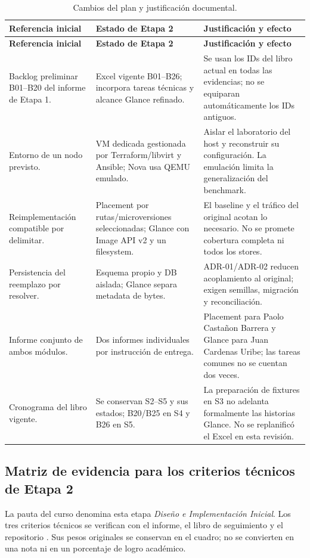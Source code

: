 \documentclass[12pt,a4paper]{article}
\newcommand{\reporttable}[4]{\begingroup\small\setlength{\LTpre}{8pt}\setlength{\LTpost}{8pt}\setlength{\tabcolsep}{4pt}\renewcommand{\arraystretch}{1.15}
\begin{longtable}{#2}\caption{#1}\\\toprule #3\\\midrule\endfirsthead
\toprule #3\\\midrule\endhead\bottomrule\endfoot #4\end{longtable}\endgroup}
\begin{document}
\reporttable{Cambios del plan y justificación documental.}{>{\raggedright\arraybackslash}p{4.1cm}>{\raggedright\arraybackslash}p{5.3cm}>{\raggedright\arraybackslash}p{5.3cm}}{\textbf{Referencia inicial}&\textbf{Estado de Etapa 2}&\textbf{Justificación y efecto}}{
Backlog preliminar B01--B20 del informe de Etapa 1.&Excel vigente B01--B26; incorpora tareas técnicas y alcance Glance refinado.&Se usan los IDs del libro actual en todas las evidencias; no se equiparan automáticamente los IDs antiguos.\\*
Entorno de un nodo previsto.&VM dedicada gestionada por Terraform/libvirt y Ansible; Nova usa QEMU emulado.&Aislar el laboratorio del host y reconstruir su configuración. La emulación limita la generalización del benchmark.\\*
Reimplementación compatible por delimitar.&Placement por rutas/microversiones seleccionadas; Glance con Image API v2 y un filesystem.&El baseline y el tráfico del original acotan lo necesario. No se promete cobertura completa ni todos los stores.\\*
Persistencia del reemplazo por resolver.&Esquema propio y DB aislada; Glance separa metadata de bytes.&ADR-01/ADR-02 reducen acoplamiento al original; exigen semillas, migración y reconciliación.\\*
Informe conjunto de ambos módulos.&Dos informes individuales por instrucción de entrega.&Placement para Paolo Castañon Barrera y Glance para Juan Cardenas Uribe; las tareas comunes no se cuentan dos veces.\\*
Cronograma del libro vigente.&Se conservan S2--S5 y sus estados; B20/B25 en S4 y B26 en S5.&La preparación de fixtures en S3 no adelanta formalmente las historias Glance. No se replanificó el Excel en esta revisión.\\}


\Needspace{365pt}
\subsection{Matriz de evidencia para los criterios técnicos de Etapa 2}
La pauta del curso denomina esta etapa \textit{Diseño e Implementación Inicial}. Los tres criterios técnicos se verifican con el informe, el libro de seguimiento y el repositorio \cite{rubric}. Sus pesos originales se conservan en el cuadro; no se convierten en una nota ni en un porcentaje de logro académico.
\end{document}
